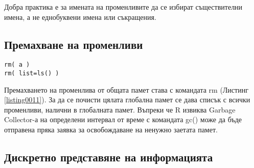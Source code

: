 Добра практика е за имената на променливите да се избират съществителни имена, а не еднобуквени имена или съкращения. 

\subsection{Премахване на променливи}

\begin{lstlisting}[caption=Премахване на променливи от глобалната памет, label=listing0011]
rm( a )
rm( list=ls() )
\end{lstlisting}

Премахването на променлива от общата памет става с командата rm (Листинг \ref{listing0011}). За да се почисти цялата глобална памет се дава списък с всички променливи, налични в глобалната памет. Въпреки че R извиква Garbage Collector-а на определени интервал от време с командата gc() може да бъде отправена пряка заявка за освобождаване на ненужно заетата памет. 

\subsection{Дискретно представяне на информацията}

